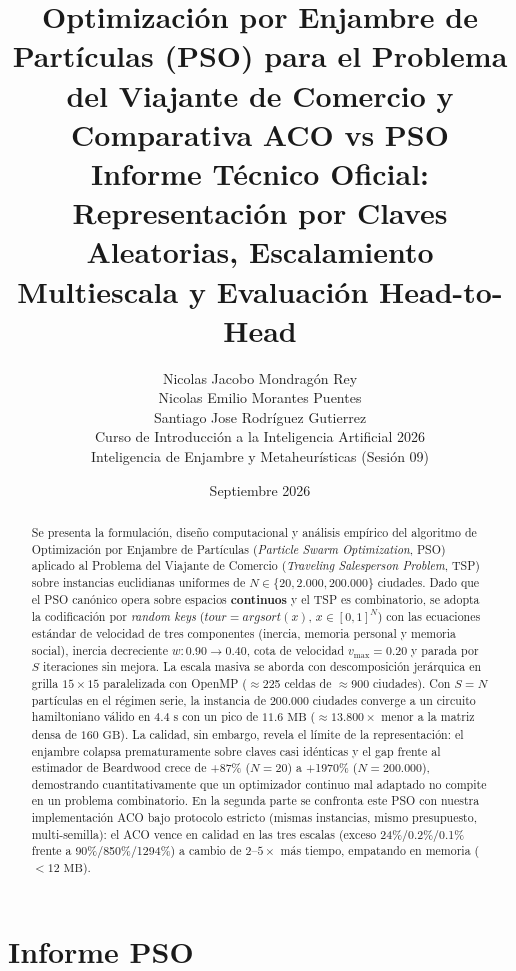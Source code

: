 \documentclass[11pt,a4paper]{article}
\title{Optimización por Enjambre de Partículas (PSO) para el Problema del Viajante de Comercio y Comparativa ACO vs PSO\\ \large Informe Técnico Oficial: Representación por Claves Aleatorias, Escalamiento Multiescala y Evaluación Head-to-Head}
\author{
  Nicolas Jacobo Mondragón Rey \\
  Nicolas Emilio Morantes Puentes \\
  Santiago Jose Rodríguez Gutierrez \\[0.8em]
  Curso de Introducción a la Inteligencia Artificial 2026 \\
  \small Inteligencia de Enjambre y Metaheurísticas (Sesión 09)
}
\date{Septiembre 2026}
\begin{document}
\maketitle

\begin{abstract}
Se presenta la formulación, diseño computacional y análisis empírico del algoritmo de Optimización por Enjambre de Partículas (\emph{Particle Swarm Optimization}, PSO) aplicado al Problema del Viajante de Comercio (\emph{Traveling Salesperson Problem}, TSP) sobre instancias euclidianas uniformes de $N \in \{20, 2.000, 200.000\}$ ciudades. Dado que el PSO canónico opera sobre espacios \textbf{continuos} y el TSP es combinatorio, se adopta la codificación por \textit{random keys} ($tour = argsort(x)$, $x \in [0,1]^N$) con las ecuaciones estándar de velocidad de tres componentes (inercia, memoria personal y memoria social), inercia decreciente $w:0{.}90 \to 0{.}40$, cota de velocidad $v_{\max}=0{.}20$ y parada por $S$ iteraciones sin mejora. La escala masiva se aborda con descomposición jerárquica en grilla $15\times15$ paralelizada con OpenMP ($\approx$225 celdas de $\approx$900 ciudades). Con $S=N$ partículas en el régimen serie, la instancia de $200.000$ ciudades converge a un circuito hamiltoniano válido en $4{.}4\text{ s}$ con un pico de \textbf{$11{.}6\text{ MB}$} ($\approx 13.800\times$ menor a la matriz densa de $160\text{ GB}$). La calidad, sin embargo, revela el límite de la representación: el enjambre colapsa prematuramente sobre claves casi idénticas y el gap frente al estimador de Beardwood crece de +87\% ($N=20$) a +1970\% ($N=200.000$), demostrando cuantitativamente que un optimizador continuo mal adaptado no compite en un problema combinatorio.
En la segunda parte se confronta este PSO con nuestra implementación ACO bajo protocolo estricto (mismas instancias, mismo presupuesto, multi-semilla): el ACO vence en calidad en las tres escalas (exceso 24\%/0.2\%/0.1\% frente a 90\%/850\%/1294\%) a cambio de $2$--$5\times$ más tiempo, empatando en memoria ($<12\text{ MB}$).
\end{abstract}

\part{Informe PSO}%

\end{document}
